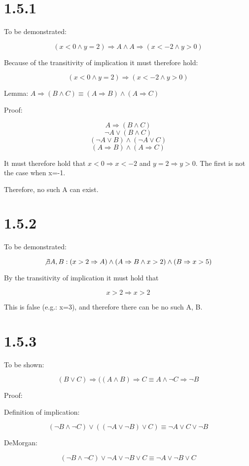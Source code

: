 \documentclass{article}
\begin{document}
\section*{1.5.1}

To be demonstrated:

$$ (x<0 \land y=2) \Rightarrow A \land A \Rightarrow (x<-2 \land y>0) $$

Because of the transitivity of implication it must therefore hold:

$$ (x<0 \land y=2) \Rightarrow (x<-2 \land y>0) $$

Lemma: $ A \Rightarrow (B \land C) \equiv (A \Rightarrow B) \land (A \Rightarrow C) $

Proof:

$$ A \Rightarrow (B \land C) $$
$$ \neg A \lor (B \land C) $$
$$ (\neg A \lor B) \land (\neg A \lor C) $$
$$ (A \Rightarrow B) \land (A \Rightarrow C) $$

It must therefore hold that $x<0 \Rightarrow x<-2$ and $y=2 \Rightarrow y>0$. The first
is not the case when x=-1.

Therefore, no such A can exist.

\section*{1.5.2}

To be demonstrated:

$$ \not\exists A,B: (x>2 \Rightarrow A) \land (A \Rightarrow B \land x>2) \land (B \Rightarrow x>5) $$

By the transitivity of implication it must hold that

$$ x>2 \Rightarrow x>2 $$

This is false (e.g.: x=3), and therefore there can be no such A, B.

\section*{1.5.3}

To be shown:

$$ (B \lor C) \Rightarrow ((A \land B) \Rightarrow C \equiv A \land \neg C \Rightarrow \neg B $$

Proof:

Definition of implication:

$$ (\neg B \land \neg C) \lor ((\neg A \lor \neg B) \lor C) \equiv \neg A \lor C \lor \neg B $$

DeMorgan:

$$ (\neg B \land \neg C ) \lor \neg A \lor \neg B \lor C \equiv \neg A \lor \neg B \lor C $$
\end{document}
